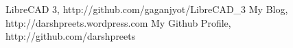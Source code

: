 \begin{thebibliography}{9}
\bibitem{} LibreCAD 3, http://github.com/gaganjyot/LibreCAD\_3
\bibitem{} My Blog,
http://darshpreets.wordpress.com
\bibitem{} My Github Profile,
http://github.com/darshpreets
\end{thebibliography}

